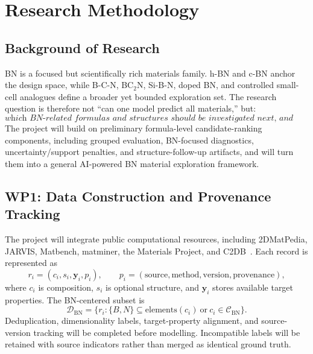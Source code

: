 \documentclass[10pt,a4paper]{article}
\begin{document}
\section{Research Methodology}
\subsection{Background of Research}
BN is a focused but scientifically rich materials family. h-BN and c-BN anchor the design space, while B-C-N, BC$_2$N, Si-B-N, doped BN, and controlled small-cell analogues define a broader yet bounded exploration set. The research question is therefore not ``can one model predict all materials,'' but:
\[
  \textit{which BN-related formulas and structures should be investigated next, and with what uncertainty?}
\]
The project will build on preliminary formula-level candidate-ranking components, including grouped evaluation, BN-focused diagnostics, uncertainty/support penalties, and structure-follow-up artifacts, and will turn them into a general AI-powered BN material exploration framework.

\subsection{WP1: Data Construction and Provenance Tracking}
The project will integrate public computational resources, including 2DMatPedia, JARVIS, Matbench, matminer, the Materials Project, and C2DB~\cite{zhou2019_2dmatpedia,choudhary2020_jarvis,dunn2020_matbench,ward2018_matminer,jain2013_mp,haastrup2018_c2db}. Each record is represented as
\[
  r_i=(c_i,s_i,\mathbf{y}_i,p_i),\qquad
  p_i=(\mathrm{source},\mathrm{method},\mathrm{version},\mathrm{provenance}),
\]
where $c_i$ is composition, $s_i$ is optional structure, and $\mathbf{y}_i$ stores available target properties. The BN-centered subset is
\[
  \mathcal{D}_{\mathrm{BN}}=\{r_i:\{B,N\}\subseteq\mathrm{elements}(c_i)\ \mathrm{or}\ c_i\in\mathcal{C}_{\mathrm{BN}}\}.
\]
Deduplication, dimensionality labels, target-property alignment, and source-version tracking will be completed before modelling. Incompatible labels will be retained with source indicators rather than merged as identical ground truth.
\end{document}
